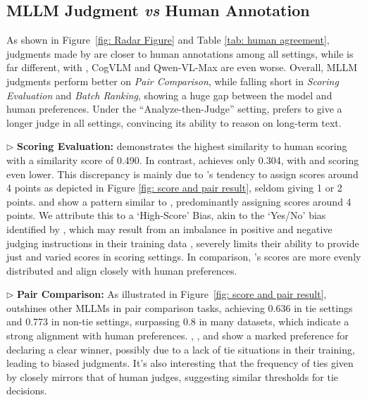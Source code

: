 \subsection{MLLM Judgment \textit{vs} Human Annotation}
As shown in Figure~\ref{fig: Radar Figure} and Table \ref{tab: human agreement}, judgments made by  are closer to human annotations among all settings, while  is far different, with , CogVLM and Qwen-VL-Max are even worse. Overall, MLLM judgments perform better on \textit{Pair Comparison}, while falling short in \textit{Scoring Evaluation} and \textit{Batch Ranking}, showing a huge gap between the model and human preferences. Under the ``Analyze-then-Judge'' setting,  prefers to give a longer judge in all settings, convincing its ability to reason on long-term text.

    $\triangleright$ \textbf{Scoring Evaluation:}  demonstrates the highest similarity to human scoring with a similarity score of 0.490. In contrast,  achieves only 0.304, with  and  scoring even lower. This discrepancy is mainly due to 's tendency to assign scores around 4 points as depicted in Figure \ref{fig: score and pair result}, seldom giving 1 or 2 points.  and  show a pattern similar to , predominantly assigning scores around 4 points. We attribute this to a `High-Score' Bias, akin to the `Yes/No' bias identified by \citet{liu2023hallusionbench}, which may result from an imbalance in positive and negative judging instructions in their training data \citep{liu2023aligning}, severely limits their ability to provide just and varied scores in scoring settings. In comparison, 's scores are more evenly distributed and align closely with human preferences.  
    
    $\triangleright$ \textbf{Pair Comparison:} As illustrated in Figure~\ref{fig: score and pair result},  outshines other MLLMs in pair comparison tasks, achieving 0.636 in tie settings and 0.773 in non-tie settings, surpassing 0.8 in many datasets, which indicate a strong alignment with human preferences. , , and  show a marked preference for declaring a clear winner, possibly due to a lack of tie situations in their training, leading to biased judgments. It's also interesting that the frequency of ties given by  closely mirrors that of human judges, suggesting similar thresholds for tie decisions.
    

